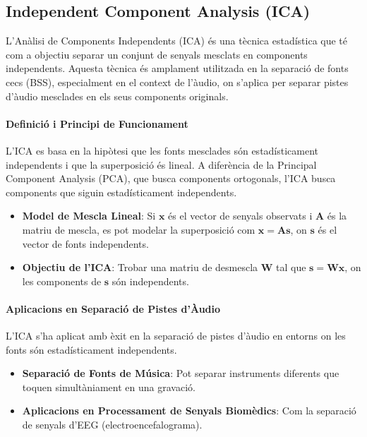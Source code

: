\documentclass[10pt,a4paper,twocolumn,twoside]{article}
\begin{document}
\subsection{Independent Component Analysis (ICA)}
L'Anàlisi de Components Independents (ICA) \cite{ICA_hyvarinen2000independent, ICA_Sawada_Ono_Kameoka_Kitamura_Saruwatari_2019} és una tècnica estadística que té com a objectiu separar un conjunt de senyals mesclats en components independents. Aquesta tècnica és amplament utilitzada en la separació de fonts cecs (BSS), especialment en el context de l'àudio, on s'aplica per separar pistes d'àudio mesclades en els seus components originals.

\paragraph{Definició i Principi de Funcionament}
L'ICA es basa en la hipòtesi que les fonts mesclades són estadísticament independents i que la superposició és lineal. A diferència de la Principal Component Analysis (PCA), que busca components ortogonals, l'ICA busca components que siguin estadísticament independents.

\begin{itemize}
    \item \textbf{Model de Mescla Lineal}: Si $\mathbf{x}$ és el vector de senyals observats i $\mathbf{A}$ és la matriu de mescla, es pot modelar la superposició com $\mathbf{x} = \mathbf{A} \mathbf{s}$, on $\mathbf{s}$ és el vector de fonts independents.
    \item \textbf{Objectiu de l'ICA}: Trobar una matriu de desmescla $\mathbf{W}$ tal que $\mathbf{s} = \mathbf{W} \mathbf{x}$, on les components de $\mathbf{s}$ són independents.
\end{itemize}


\paragraph{Aplicacions en Separació de Pistes d'Àudio}
L'ICA s'ha aplicat amb èxit en la separació de pistes d'àudio en entorns on les fonts són estadísticament independents.

\begin{itemize}
    \item \textbf{Separació de Fonts de Música}: Pot separar instruments diferents que toquen simultàniament en una gravació.
    \item \textbf{Aplicacions en Processament de Senyals Biomèdics}: Com la separació de senyals d'EEG (electroencefalograma).
\end{itemize}
\end{document}
